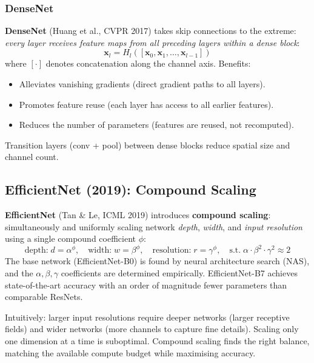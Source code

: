 \documentclass[11pt,a4paper]{article}
\newcommand{\term}[1]{\textcolor{DefGreen}{\textbf{#1}}}
\begin{document}
\subsubsection{DenseNet}

\term{DenseNet} (Huang et al., CVPR 2017) takes skip connections to the extreme: \emph{every layer receives feature maps from all preceding layers within a dense block}:
\[
\mathbf{x}_l = H_l([\mathbf{x}_0, \mathbf{x}_1, \ldots, \mathbf{x}_{l-1}])
\]
where $[\cdot]$ denotes concatenation along the channel axis. Benefits:
\begin{itemize}
  \item Alleviates vanishing gradients (direct gradient paths to all layers).
  \item Promotes feature reuse (each layer has access to all earlier features).
  \item Reduces the number of parameters (features are reused, not recomputed).
\end{itemize}
Transition layers (conv + pool) between dense blocks reduce spatial size and channel count.

\subsection{EfficientNet (2019): Compound Scaling}
\label{sec:efficientnet}

\term{EfficientNet} (Tan \& Le, ICML 2019) introduces \term{compound scaling}: simultaneously and uniformly scaling network \emph{depth}, \emph{width}, and \emph{input resolution} using a single compound coefficient $\phi$:
\[
\text{depth:}\; d = \alpha^\phi, \quad \text{width:}\; w = \beta^\phi, \quad \text{resolution:}\; r = \gamma^\phi, \quad \text{s.t.}\; \alpha \cdot \beta^2 \cdot \gamma^2 \approx 2
\]
The base network (EfficientNet-B0) is found by neural architecture search (NAS), and the $\alpha, \beta, \gamma$ coefficients are determined empirically. EfficientNet-B7 achieves state-of-the-art accuracy with an order of magnitude fewer parameters than comparable ResNets.

\begin{insightbox}
Intuitively: larger input resolutions require deeper networks (larger receptive fields) and wider networks (more channels to capture fine details). Scaling only one dimension at a time is suboptimal. Compound scaling finds the right balance, matching the available compute budget while maximising accuracy.
\end{insightbox}
\end{document}
